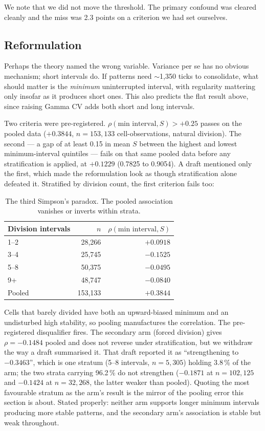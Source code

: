 \documentclass[11pt,letterpaper]{article}
\begin{document}
We note that we did not move the threshold. The primary confound was
cleared cleanly and the miss was 2.3 points on a criterion we had set
ourselves.

\subsection{Reformulation}

Perhaps the theory named the wrong variable. Variance per se has no
obvious mechanism; short intervals do. If patterns need
$\sim$1{,}350 ticks to consolidate, what should matter is the
\emph{minimum} uninterrupted interval, with regularity mattering only
insofar as it produces short ones. This also predicts the flat result
above, since raising Gamma CV adds both short and long intervals.

Two criteria were pre-registered. $\rho(\text{min interval}, S) > +0.25$
passes on the pooled data ($+0.3844$, $n = 153{,}133$
cell-observations, natural division). The second --- a gap of at least
0.15 in mean $S$ between the highest and lowest minimum-interval
quintiles --- fails on that same pooled data before any stratification
is applied, at $+0.1229$ (0.7825 to 0.9054). A draft mentioned only the
first, which made the reformulation look as though stratification alone
defeated it. Stratified by division count, the first criterion fails
too:

\begin{table}[H]
\centering
\caption{The third Simpson's paradox. The pooled association vanishes
or inverts within strata.}
\begin{tabular}{lrr}
\toprule
Division intervals & $n$ & $\rho(\text{min interval}, S)$ \\
\midrule
1--2 & 28{,}266 & $+0.0918$ \\
3--4 & 25{,}745 & $-0.1525$ \\
5--8 & 50{,}375 & $-0.0495$ \\
9+ & 48{,}747 & $-0.0840$ \\
\midrule
Pooled & 153{,}133 & $\mathbf{+0.3844}$ \\
\bottomrule
\end{tabular}
\end{table}

Cells that barely divided have both an upward-biased minimum and an
undisturbed high stability, so pooling manufactures the correlation. The
pre-registered disqualifier fires. The secondary arm (forced division)
gives $\rho = -0.1484$ pooled and does not reverse under
stratification, but we withdraw the way a draft summarised it. That
draft reported it as ``strengthening to $-0.3463$'', which is one
stratum (5--8 intervals, $n = 5{,}305$) holding 3.8\,\% of the arm; the
two strata carrying 96.2\,\% do not strengthen ($-0.1871$ at
$n = 102{,}125$ and $-0.1424$ at $n = 32{,}268$, the latter weaker than
pooled). Quoting the most favourable stratum as the arm's result is the
mirror of the pooling error this section is about. Stated properly:
neither arm supports longer minimum intervals producing more stable
patterns, and the secondary arm's association is stable but weak
throughout.
\end{document}
